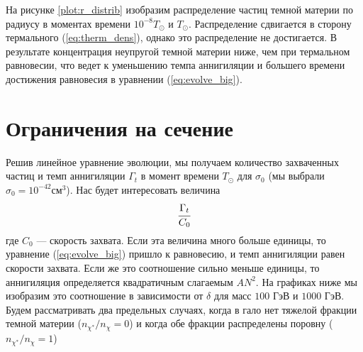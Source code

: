 На рисунке \ref{plot:r_distrib} изобразим распределение частиц темной материи по радиусу в моментах времени $10^{-8}T_{\odot}$ и $T_{\odot}$. Распределение сдвигается в сторону термального (\ref{eq:therm_dens}), однако это распределение не достигается. В результате концентрация неупругой темной материи ниже, чем при термальном равновесии, что ведет к уменьшению темпа аннигиляции и большего времени достижения равновесия в уравнении (\ref{eq:evolve_big}).
 
\section{Ограничения на сечение}

Решив линейное уравнение эволюции, мы получаем количество захваченных частиц и темп аннигиляции $\Gamma_t$ в момент времени $T_{\odot}$ для $\sigma_0$ (мы выбрали $\sigma_0 = 10^{-42} \text{см}^3$). Нас будет интересовать величина 
\begin{equation}
	\cfrac{\Gamma_t}{C_0}
\end{equation}
где $C_0$ --- скорость захвата. Если эта величина много больше единицы, то уравнение (\ref{eq:evolve_big}) пришло к равновесию, и темп аннигиляции равен скорости захвата. Если же это соотношение сильно меньше единицы, то аннигиляция определяется квадратичным слагаемым $AN^2$. На графиках ниже мы изобразим это соотношение в зависимости от $\delta$ для масс $100$ ГэВ и $1000$ ГэВ.
Будем рассматривать два предельных случаях, когда в гало нет тяжелой фракции темной материи ($n_{\chi^*}/n_{\chi}= 0$) и когда обе фракции распределены поровну ($n_{\chi^*}/n_{\chi}= 1$)
